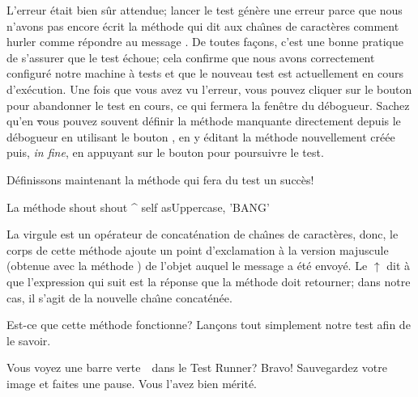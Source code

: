 \documentclass[a4paper,10pt,twoside]{book}
\begin{document}
L'erreur \'etait bien s\^ur attendue; lancer le test g\'en\`ere une
erreur parce que nous n'avons pas encore \'ecrit la m\'ethode qui dit
aux cha\^{\i}nes de caract\`eres comment hurler 
\cad comme r\'epondre au message .
De toutes fa\c{c}ons, c'est une bonne pratique de s'assurer que le test
\'echoue; cela confirme que nous avons correctement
configur\'e notre machine \`a tests %
et que le nouveau test est actuellement en cours d'ex\'ecution.
Une fois que vous avez vu l'erreur, vous pouvez cliquer sur le bouton
 pour abandonner le test en cours, ce qui fermera la
fen\^etre du d\'ebogueur.
Sachez qu'en \st vous pouvez souvent d\'efinir la m\'ethode manquante
directement depuis le d\'ebogueur 
en utilisant le bouton , en y \'editant la m\'ethode
nouvellement cr\'e\'ee puis, \emph{in fine}, en appuyant sur le bouton
 pour poursuivre le test.

D\'efinissons maintenant la m\'ethode qui fera du test un succ\`es!

\begin{method}[shout]{La m\'ethode shout}
shout
	^ self asUppercase, 'BANG'
\end{method}

La virgule est un op\'erateur de concat\'enation de cha\^{\i}nes de
caract\`eres, donc, le corps de cette m\'ethode ajoute un point
d'exclamation \`a la version majuscule
(obtenue avec la m\'ethode )
de l'objet  auquel le message  a \'et\'e
envoy\'e.
Le $\uparrow$ dit \`a \sq que l'expression qui suit est la r\'eponse
que la m\'ethode doit retourner; dans notre cas, il s'agit de la
nouvelle cha\^{\i}ne concat\'en\'ee.

Est-ce que cette m\'ethode fonctionne? Lan\c{c}ons tout simplement
notre test afin de le savoir.

Vous voyez une barre verte~\footnotemark\ dans le Test Runner? Bravo!
Sauvegardez votre image et faites une pause. 
Vous l'avez bien m\'erit\'e. 
\end{document}
